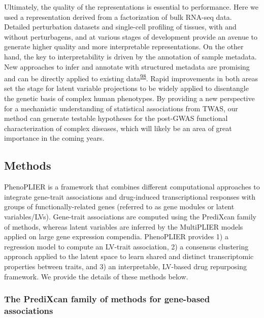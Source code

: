 \documentclass[
  a4paper,
]{article}
\begin{document}
Ultimately, the quality of the representations is essential to performance.
Here we used a representation derived from a factorization of bulk RNA-seq data.
Detailed perturbation datasets and single-cell profiling of tissues, with and without perturbagens, and at various stages of development provide an avenue to generate higher quality and more interpretable representations.
On the other hand, the key to interpretability is driven by the annotation of sample metadata.
New approaches to infer and annotate with structured metadata are promising and can be directly applied to existing data\textsuperscript{\protect\hyperlink{ref-fnDaLjFy}{98}}.
Rapid improvements in both areas set the stage for latent variable projections to be widely applied to disentangle the genetic basis of complex human phenotypes.
By providing a new perspective for a mechanistic understanding of statistical associations from TWAS, our method can generate testable hypotheses for the post-GWAS functional characterization of complex diseases, which will likely be an area of great importance in the coming years.

\hypertarget{sec:methods}{%
\subsection{Methods}\label{sec:methods}}

PhenoPLIER is a framework that combines different computational approaches to integrate gene-trait associations and drug-induced transcriptional responses with groups of functionally-related genes (referred to as gene modules or latent variables/LVs).
Gene-trait associations are computed using the PrediXcan family of methods, whereas latent variables are inferred by the MultiPLIER models applied on large gene expression compendia.
PhenoPLIER provides
1) a regression model to compute an LV-trait association,
2) a consensus clustering approach applied to the latent space to learn shared and distinct transcriptomic properties between traits, and
3) an interpretable, LV-based drug repurposing framework.
We provide the details of these methods below.

\hypertarget{sec:methods:predixcan}{%
\subsubsection{The PrediXcan family of methods for gene-based associations}\label{sec:methods:predixcan}}
\end{document}
